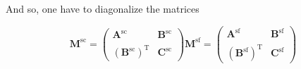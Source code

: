 \documentclass[aip,jcp,reprint,noshowkeys,superscriptaddress]{revtex4-1}
\newcommand{\bO}{\mathbf{0}}
\newcommand{\bA}[2]{\mathbf{A}_{#1}^{#2}}
\newcommand{\bB}[2]{\mathbf{B}_{#1}^{#2}}
\newcommand{\bC}[2]{\mathbf{C}_{#1}^{#2}}
\newcommand{\bM}[2]{\mathbf{M}_{#1}^{#2}}
\newcommand{\upup}{\uparrow\uparrow}
\newcommand{\updw}{\uparrow\downarrow}
\newcommand{\dwup}{\downarrow\uparrow}
\newcommand{\dwdw}{\downarrow\downarrow}
\newcommand{\spc}{\text{sc}}
\newcommand{\spf}{\text{sf}}
\begin{document}
And so, one have to diagonalize the matrices 

\begin{equation}
\bM{}{\spc} = 
\begin{pmatrix}
\bA{}{\spc} & \bB{}{\spc} \\
(\bB{}{\spc})^{\text{T}} & \bC{}{\spc}
\end{pmatrix}
%
\bM{}{\spf} = 
\begin{pmatrix}
\bA{}{\spf} & \bB{}{\spf} \\
(\bB{}{\spf})^{\text{T}} & \bC{}{\spf}
\end{pmatrix}
\end{equation}



\end{document}
